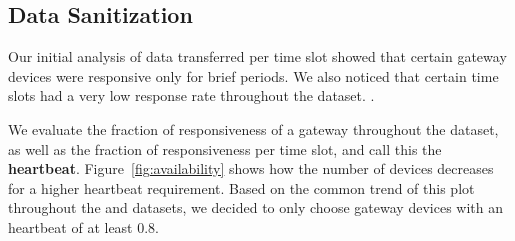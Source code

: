 \subsection{Data Sanitization}

Our initial analysis of data transferred per time slot showed that certain 
gateway devices were responsive only for brief periods. We also noticed that 
certain time slots had a very low response rate throughout the dataset. 
.

We evaluate the fraction of responsiveness of a gateway throughout the dataset, 
as well as the fraction of responsiveness per time slot, and call this the 
\textbf{heartbeat}. Figure~\ref{fig:availability} shows how the number of 
devices decreases for a higher heartbeat requirement. Based on the common 
trend of this plot throughout the \test and \control datasets, we decided to 
only choose gateway devices with an heartbeat of at least 0.8. 


